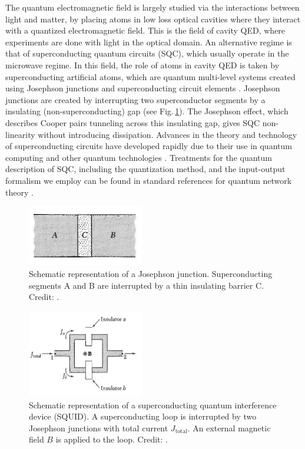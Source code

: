 The quantum electromagnetic field is largely studied via the interactions between light and matter, by placing atoms in low loss optical cavities where they interact with a quantized electromagnetic field. This is the field of cavity QED, where experiments are done with light in the optical domain. An alternative regime is that of superconducting quantum circuits (SQC), which usually operate in the microwave regime. In this field, the role of atoms in cavity QED is taken by superconducting artificial atoms, which are quantum multi-level systems created using Josephson junctions and superconducting circuit elements \cite{Gu2017}. Josephson junctions are created by interrupting two superconductor segments by a insulating (non-superconducting) gap (see Fig.\,\ref{fig:Kittel_JJ}). The Josephson effect, which describes Cooper pairs tunneling across this insulating gap, gives SQC non-linearity without introducing dissipation.
Advances in the theory and technology of superconducting circuits have developed rapidly due to their use in quantum computing and other quantum technologies \cite{Krantz2019}.
Treatments for the quantum description of SQC, including the quantization method, and the input-output formalism we employ can be found in standard references for quantum network theory \cite{Yurke1984, Vool2017}.

\begin{figure}[h]
    \centering
    \includegraphics[width=2in, keepaspectratio]{figures/intro/Kittel_Josephson.png}
    \caption{Schematic representation of a Josephson junction. Superconducting segments A and B are interrupted by a thin insulating barrier C. Credit: \protect\cite{Kittel1996_Solid_State}.}
    \label{fig:Kittel_JJ}
\end{figure}

\begin{figure}
    \centering
    \includegraphics[width=2in, keepaspectratio]{figures/intro/Kittel_SQUID.png}
    \caption{Schematic representation of a superconducting quantum interference device (SQUID). A superconducting loop is interrupted by two Josephson junctions with total current $J_{\text{total}}$. An external magnetic field $B$ is applied to the loop. Credit: \protect\cite{Kittel1996_Solid_State}.}
    \label{fig:Kittel_SQUID}
\end{figure}

